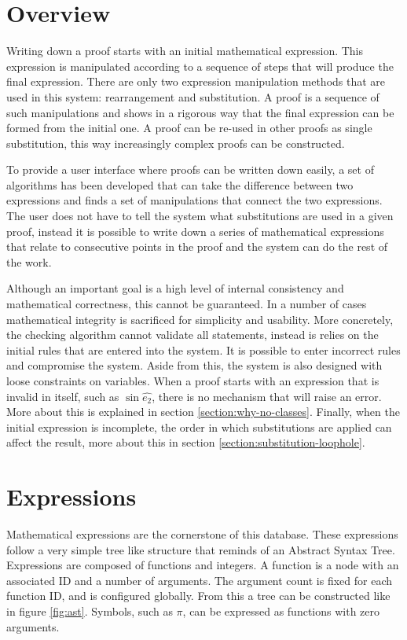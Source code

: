 \documentclass{article}
\begin{document}
\section{Overview}
Writing down a proof starts with an initial mathematical expression. This expression is manipulated according to a sequence of steps that will produce the final expression. There are only two expression manipulation methods that are used in this system: rearrangement and substitution.  A proof is a sequence of such manipulations and shows in a rigorous way that the final expression can be formed from the initial one. A proof can be re-used in other proofs as single substitution, this way increasingly complex proofs can be constructed. \par
To provide a user interface where proofs can be written down easily, a set of algorithms has been developed that can take the difference between two expressions and finds a set of manipulations that connect the two expressions. The user does not have to tell the system what substitutions are used in a given proof, instead it is possible to write down a series of mathematical expressions that relate to consecutive points in the proof and the system can do the rest of the work. \par
Although an important goal is a high level of internal consistency and mathematical correctness, this cannot be guaranteed. In a number of cases mathematical integrity is sacrificed for simplicity and usability. More concretely, the checking algorithm cannot validate all statements, instead is relies on the initial rules that are entered into the system. It is possible to enter incorrect rules and compromise the system. Aside from this, the system is also designed with loose constraints on variables. When a proof starts with an expression that is invalid in itself, such as $\sin\hat{e_2}$, there is no mechanism that will raise an error. More about this is explained in section \ref{section:why-no-classes}. Finally, when the initial expression is incomplete, the order in which substitutions are applied can affect the result, more about this in section \ref{section:substitution-loophole}.

\section{Expressions}
Mathematical expressions are the cornerstone of this database. These expressions follow a very simple tree like structure that reminds of an Abstract Syntax Tree. Expressions are composed of functions and integers. A function is a node with an associated ID and a number of arguments. The argument count is fixed for each function ID, and is configured globally. From this a tree can be constructed like in figure \ref{fig:ast}. Symbols, such as $\pi$, can be expressed as functions with zero arguments.
\end{document}
